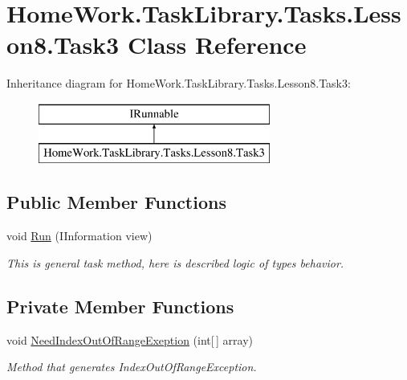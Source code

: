 \hypertarget{class_home_work_1_1_task_library_1_1_tasks_1_1_lesson8_1_1_task3}{}\section{Home\+Work.\+Task\+Library.\+Tasks.\+Lesson8.\+Task3 Class Reference}
\label{class_home_work_1_1_task_library_1_1_tasks_1_1_lesson8_1_1_task3}
Inheritance diagram for Home\+Work.\+Task\+Library.\+Tasks.\+Lesson8.\+Task3\+:\begin{figure}[H]
\begin{center}
\leavevmode
\includegraphics[height=2.000000cm]{class_home_work_1_1_task_library_1_1_tasks_1_1_lesson8_1_1_task3}
\end{center}
\end{figure}
\subsection*{Public Member Functions}
\begin{DoxyCompactItemize}
\item 
void \mbox{\hyperlink{class_home_work_1_1_task_library_1_1_tasks_1_1_lesson8_1_1_task3_a4b4f4b4465f48fc243e76224ce77948d}{Run}} (I\+Information view)
\begin{DoxyCompactList}\small\item\em This is general task method, here is described logic of types behavior. \end{DoxyCompactList}\end{DoxyCompactItemize}
\subsection*{Private Member Functions}
\begin{DoxyCompactItemize}
\item 
void \mbox{\hyperlink{class_home_work_1_1_task_library_1_1_tasks_1_1_lesson8_1_1_task3_ad9ddfa1443dc7cb6ce0e8da79409e46b}{Need\+Index\+Out\+Of\+Range\+Exeption}} (int\mbox{[}$\,$\mbox{]} array)
\begin{DoxyCompactList}\small\item\em Method that generates Index\+Out\+Of\+Range\+Exception. \end{DoxyCompactList}\end{DoxyCompactItemize}
